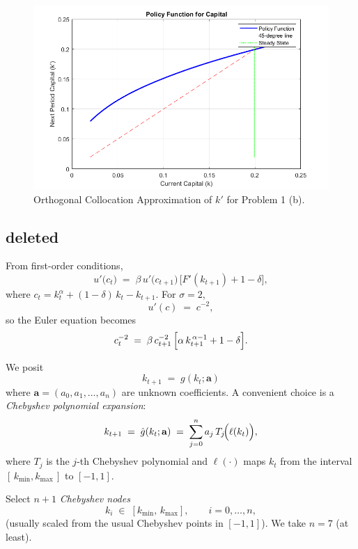 \documentclass[12pt]{article}
\begin{document}
\begin{figure}[H]
    \centering
        \includegraphics[width=\textwidth]{pset3_q1b.png}
        \caption{Orthogonal Collocation Approximation of $k'$ for Problem 1 (b).}
        \label{fig:1b}
\end{figure}


\iffalse 
\subsection{deleted}
From first-order conditions,
\[
u'\bigl(c_t\bigr)
\;=\;
\beta\,u'\bigl(c_{t+1}\bigr)\,\bigl[F'(k_{t+1}) + 1-\delta\bigr],
\]
where $c_t = k_t^\alpha + (1-\delta)\,k_t - k_{t+1}$.
For $\sigma=2$, 
\[
u'(c) \;=\; c^{-2},
\]
so the Euler equation becomes
\[
c_t^{-2}
\;=\;
\beta\,c_{t+1}^{-2}\,\Bigl[\alpha\,k_{t+1}^{\,\alpha-1} + 1-\delta\Bigr].
\]

We posit 
\[
k_{t+1} \;=\; g(k_t;\mathbf{a})
\]
where $\mathbf{a}=(a_0,a_1,\dots,a_n)$ are unknown coefficients.  A convenient choice is a \emph{Chebyshev polynomial expansion}:
\[
k_{t+1} \;=\; \hat g(k_t;\mathbf{a})
\;=\;
\sum_{j=0}^n
a_j\,T_j\!\Bigl(\ell(k_t)\Bigr),
\]
where $T_j$ is the $j$-th Chebyshev polynomial and $\ell(\cdot)$ maps $k_t$ from the interval $[\,k_{\min},k_{\max}\,]$ to $[-1,1]$.

Select $n+1$ \emph{Chebyshev nodes} 
\[
k_i
\;\in\;
[k_{\min},\,k_{\max}], 
\qquad i=0,\dots,n,
\]
(usually scaled from the usual Chebyshev points in $[-1,1]$).  We take $n=7$ (at least).
\end{document}
